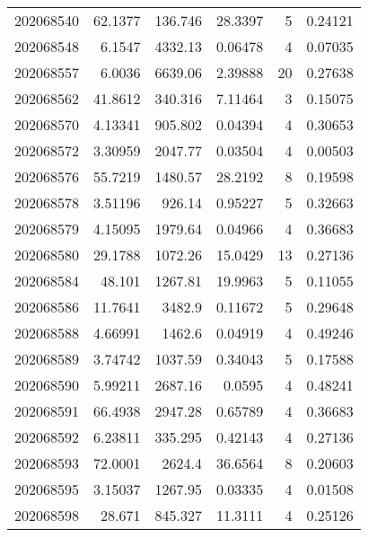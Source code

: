 \begin{tabular}{rrrrrr}
 202068540 &         62.1377  &      136.746  &           28.3397  &           5 & 0.24121 \\
 202068548 &          6.1547  &     4332.13   &            0.06478 &           4 & 0.07035 \\
 202068557 &          6.0036  &     6639.06   &            2.39888 &          20 & 0.27638 \\
 202068562 &         41.8612  &      340.316  &            7.11464 &           3 & 0.15075 \\
 202068570 &          4.13341 &      905.802  &            0.04394 &           4 & 0.30653 \\
 202068572 &          3.30959 &     2047.77   &            0.03504 &           4 & 0.00503 \\
 202068576 &         55.7219  &     1480.57   &           28.2192  &           8 & 0.19598 \\
 202068578 &          3.51196 &      926.14   &            0.95227 &           5 & 0.32663 \\
 202068579 &          4.15095 &     1979.64   &            0.04966 &           4 & 0.36683 \\
 202068580 &         29.1788  &     1072.26   &           15.0429  &          13 & 0.27136 \\
 202068584 &         48.101   &     1267.81   &           19.9963  &           5 & 0.11055 \\
 202068586 &         11.7641  &     3482.9    &            0.11672 &           5 & 0.29648 \\
 202068588 &          4.66991 &     1462.6    &            0.04919 &           4 & 0.49246 \\
 202068589 &          3.74742 &     1037.59   &            0.34043 &           5 & 0.17588 \\
 202068590 &          5.99211 &     2687.16   &            0.0595  &           4 & 0.48241 \\
 202068591 &         66.4938  &     2947.28   &            0.65789 &           4 & 0.36683 \\
 202068592 &          6.23811 &      335.295  &            0.42143 &           4 & 0.27136 \\
 202068593 &         72.0001  &     2624.4    &           36.6564  &           8 & 0.20603 \\
 202068595 &          3.15037 &     1267.95   &            0.03335 &           4 & 0.01508 \\
 202068598 &         28.671   &      845.327  &           11.3111  &           4 & 0.25126 \\

\end{tabular}
